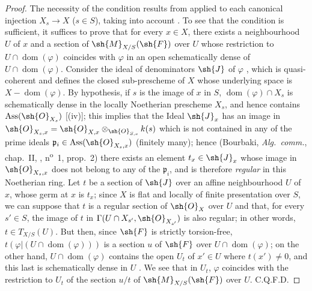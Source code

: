 \begin{proof}
The necessity of the condition results from  applied to each canonical injection $X_s\to X$ ($s\in S$), taking into account .
To see that the condition is sufficient, it suffices to prove that for every $x\in X$, there exists a neighbourhood $U$ of $x$ and a section of $\sh{M}_{X/S}(\sh{F})$ over $U$ whose restriction to $U\cap\operatorname{dom}(\varphi)$ coincides with $\varphi$ in an open schematically dense of $U\cap\operatorname{dom}(\varphi)$.
Consider the ideal of denominators $\sh{J}$ of $\varphi$ , which is quasi-coherent and defines the closed sub-prescheme of $X$ whose underlying space is $X-\operatorname{dom}(\varphi)$.
By hypothesis, if $s$ is the image of $x$ in $S$, $\operatorname{dom}(\varphi)\cap X_s$ is schematically dense in the locally Noetherian prescheme $X_s$, and hence contains $\operatorname{Ass}(\sh{O}_{X_s})$ [(iv)];
this implies that the Ideal $\sh{J}_x$ has an image in $\sh{O}_{X_s,x}=\sh{O}_{X,x}\otimes_{\sh{O}_{S,s}}k(s)$ which is not contained in any of the prime ideals $\mathfrak{p}_i\in\operatorname{Ass}(\sh{O}_{X_s,x})$ (finitely many);
hence (Bourbaki, \emph{Alg.~comm.}, chap.~II, , n\textsuperscript{o}~1, prop.~2) there exists an element $t_x\in\sh{J}_x$ whose image in $\sh{O}_{X_s,x}$ does not belong to any of the $\mathfrak{p}_i$, and is therefore \emph{regular} in this Noetherian ring.
Let $t$ be a section of $\sh{J}$ over an affine neighbourhood $U$ of $x$, whose germ at $x$ is $t_x$;
since $X$ is flat and locally of finite presentation over $S$, we can suppose  that $t$ is a regular section of $\sh{O}_X$ over $U$ and that, for every $s'\in S$, the image of $t$ in $\Gamma(U\cap X_{s'},\sh{O}_{X_{s'}})$ is also regular;
in other words, $t\in T_{X/S}(U)$.
But then, since $\sh{F}$ is strictly torsion-free, $t(\varphi|(U\cap\operatorname{dom}(\varphi)))$ is a section $u$ of $\sh{F}$ over $U\cap\operatorname{dom}(\varphi)$;
on the other hand, $U\cap\operatorname{dom}(\varphi)$ contains the open $U_t$ of $x'\in U$ where $t(x')\neq 0$, and this last is schematically dense in $U$ .
We see that in $U_t$, $\varphi$ coincides with the restriction to $U_t$ of the section $u/t$ of $\sh{M}_{X/S}(\sh{F})$ over $U$.
C.Q.F.D.
\end{proof}

